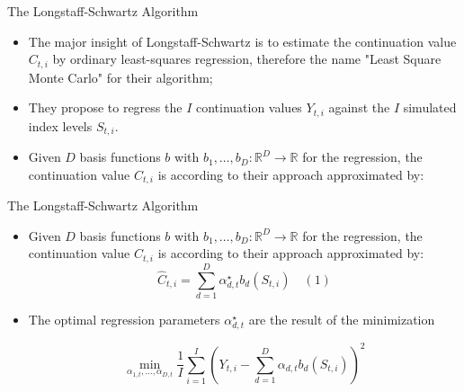 \documentclass[11pt]{beamer}
\begin{document}
\begin{frame}{The Longstaff-Schwartz Algorithm}
\begin{itemize}
\item The major insight of Longstaff-Schwartz is to estimate the continuation value $C_{t,i}$ by ordinary least-squares regression, therefore the name "Least Square Monte Carlo" for their algorithm;
\item They propose to regress the $I$ continuation values $Y_{t,i}$ against the $I$ simulated index levels $S_{t,i}$. \item Given $D$  basis functions $b$ with $b_1, \dots, b_D : \mathbb{R}^D \rightarrow \mathbb{R}$ for the regression, the continuation value $C_{t,i}$ is according to their approach approximated by: 
\end{itemize}
\end{frame}
\begin{frame}{The Longstaff-Schwartz Algorithm}
\begin{itemize}
\item Given $D$  basis functions $b$ with $b_1, \dots, b_D : \mathbb{R}^D \rightarrow \mathbb{R}$ for the regression, the continuation value $C_{t,i}$ is according to their approach approximated by: 
$$
\hat C_{t,i} = \sum\limits_{d=1}^D \alpha^\star_{d,t} b_d(S_{t,i})  \quad (1)
$$
\item The optimal regression parameters $\alpha^\star_{d,t}$ are the result of the minimization 

$$
\min\limits_{\alpha_{1,t}, \dots, \alpha_{D,t}}   \frac{1}{I} \sum\limits_{i=1}^I 
\left( Y_{t,i} - \sum\limits_{d=1}^D \alpha_{d,t} b_d(S_{t,i}) \right)^2
$$

\end{itemize}
\end{frame}
\end{document}
